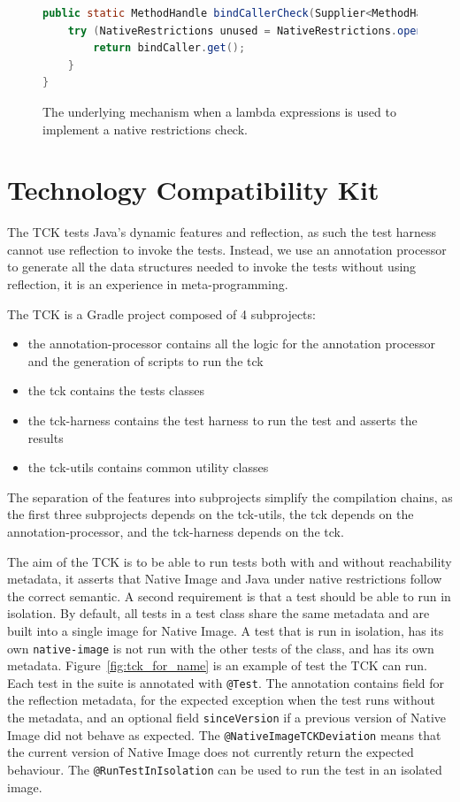 \begin{figure}[ht]
    \centering
\begin{lstlisting}[language=Java]
public static MethodHandle bindCallerCheck(Supplier<MethodHandle> bindCaller) {
    try (NativeRestrictions unused = NativeRestrictions.openScope()) {
        return bindCaller.get();
    }
}
\end{lstlisting}
    \caption{The underlying mechanism when a lambda expressions is used to implement a native restrictions check.}
    \label{fig:bind_caller_lrm}
\end{figure}

\section{Technology Compatibility Kit}\label{TCK}
The TCK tests Java's dynamic features and reflection, as such the test harness cannot use reflection to invoke the tests. Instead, we use an annotation processor to generate all the data structures needed to invoke the tests without using reflection, it is an experience in meta-programming. 

The TCK is a Gradle project composed of 4 subprojects: 
\begin{itemize}
    \item the annotation-processor contains all the logic for the annotation processor and the generation of scripts to run the tck
    \item the tck contains the tests classes
    \item the tck-harness contains the test harness to run the test and asserts the results
    \item the tck-utils contains common utility classes
\end{itemize}
The separation of the features into subprojects simplify the compilation chains, as the first three subprojects depends on the tck-utils, the tck depends on the annotation-processor, and the tck-harness depends on the tck.

The aim of the TCK is to be able to run tests both with and without reachability metadata, it asserts that Native Image and Java under native restrictions follow the correct semantic. A second requirement is that a test should be able to run in isolation. By default, all tests in a test class share the same metadata and are built into a single image for Native Image. A test that is run in isolation, has its own \verb|native-image| is not run with the other tests of the class, and has its own metadata.  
Figure~\ref{fig:tck_for_name} is an example of test the TCK can run. Each test in the suite is annotated with \verb|@Test|. The annotation contains field for the reflection metadata, for the expected exception when the test runs without the metadata, and an optional field \verb|sinceVersion| if a previous version of Native Image did not behave as expected. The \verb|@NativeImageTCKDeviation| means that the current version of Native Image does not currently return the expected behaviour.
The \verb|@RunTestInIsolation| can be used to run the test in an isolated image. 

